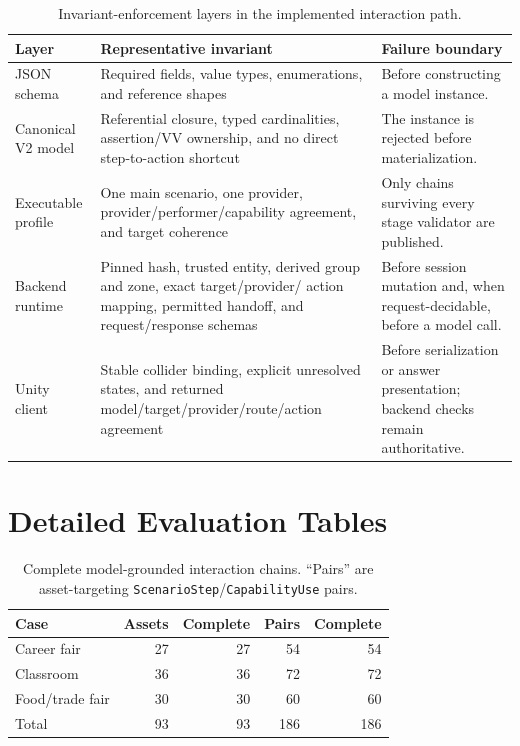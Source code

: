 \begin{table}[!htbp]
  \caption{Invariant-enforcement layers in the implemented interaction path.}
  \label{tab:enforcement-layers}
  \small
  \setlength{\tabcolsep}{4pt}
  \begin{tabular}{@{}p{}p{}p{}@{}}
    \toprule
    Layer & Representative invariant & Failure boundary \\
    \midrule
    JSON schema &
    Required fields, value types, enumerations, and reference shapes &
    Before constructing a model instance. \\
    Canonical V2 model &
    Referential closure, typed cardinalities, assertion/VV ownership, and no
    direct step-to-action shortcut &
    The instance is rejected before materialization. \\
    Executable profile &
    One main scenario, one provider, provider/performer/capability agreement,
    and target coherence &
    Only chains surviving every stage validator are published. \\
    Backend runtime &
    Pinned hash, trusted entity, derived group and zone, exact target/provider/
    action mapping, permitted handoff, and request/response schemas &
    Before session mutation and, when request-decidable, before a model call. \\
    Unity client &
    Stable collider binding, explicit unresolved states, and returned
    model/target/provider/route/action agreement &
    Before serialization or answer presentation; backend checks remain
    authoritative. \\
    \bottomrule
  \end{tabular}
\end{table}

\clearpage
\section{Detailed Evaluation Tables}

\begin{table}[!htbp]
  \caption{Complete model-grounded interaction chains. ``Pairs'' are
  asset-targeting \texttt{ScenarioStep}/\texttt{CapabilityUse} pairs.}
  \label{tab:rq1-chains}
  \centering
  \begin{tabular}{@{}lrrrr@{}}
    \toprule
    Case & Assets & Complete & Pairs & Complete \\
    \midrule
    Career fair & 27 & 27 & 54 & 54 \\
    Classroom & 36 & 36 & 72 & 72 \\
    Food/trade fair & 30 & 30 & 60 & 60 \\
    \midrule
    Total & 93 & 93 & 186 & 186 \\
    \bottomrule
  \end{tabular}
\end{table}

